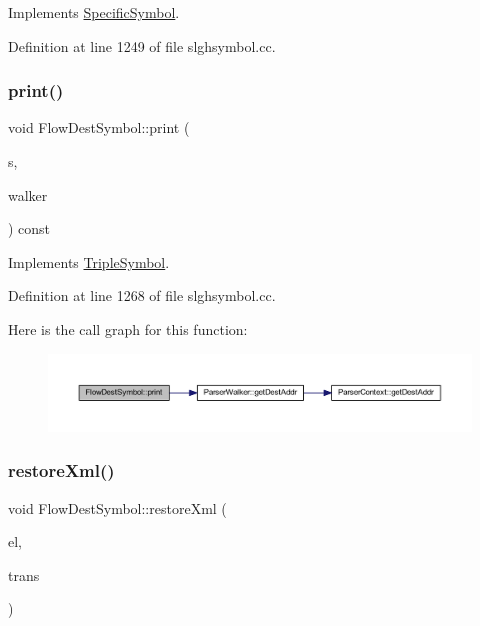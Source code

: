 Implements \mbox{\hyperlink{class_specific_symbol_abbde46a1f6af6c373420773d45e1e4e2}{Specific\+Symbol}}.



Definition at line 1249 of file slghsymbol.\+cc.

\mbox{\label{class_flow_dest_symbol_a94cdef08349b4081b2559fc39037fcce}} 
\subsubsection{\texorpdfstring{print()}{print()}}
{\footnotesize\ttfamily void Flow\+Dest\+Symbol\+::print (\begin{DoxyParamCaption}\item[{ostream \&}]{s,  }\item[{\mbox{\hyperlink{class_parser_walker}{Parser\+Walker}} \&}]{walker }\end{DoxyParamCaption}) const\hspace{0.3cm}{\ttfamily [virtual]}}



Implements \mbox{\hyperlink{class_triple_symbol_a205c4487d3ad54532097dd77eb4501fc}{Triple\+Symbol}}.



Definition at line 1268 of file slghsymbol.\+cc.

Here is the call graph for this function\+:
\nopagebreak
\begin{figure}[H]
\begin{center}
\leavevmode
\includegraphics[width=350pt]{class_flow_dest_symbol_a94cdef08349b4081b2559fc39037fcce_cgraph}
\end{center}
\end{figure}
\mbox{\label{class_flow_dest_symbol_a1ba9aafc51b34b72972f50748de739cc}} 
\subsubsection{\texorpdfstring{restoreXml()}{restoreXml()}}
{\footnotesize\ttfamily void Flow\+Dest\+Symbol\+::restore\+Xml (\begin{DoxyParamCaption}\item[{const \mbox{\hyperlink{class_element}{Element}} $\ast$}]{el,  }\item[{\mbox{\hyperlink{class_sleigh_base}{Sleigh\+Base}} $\ast$}]{trans }\end{DoxyParamCaption})\hspace{0.3cm}{\ttfamily [virtual]}}



